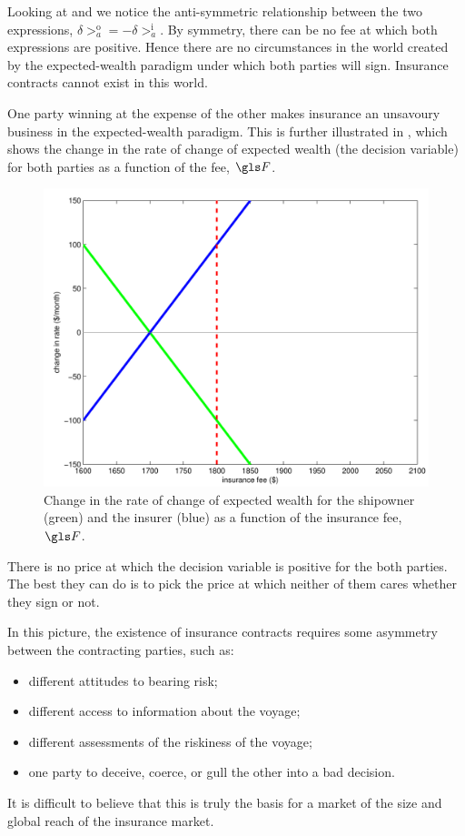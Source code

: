Looking at  and  we notice the anti-symmetric relationship between
the two expressions,  
$\delta\gt_a^\text{o}=-\delta\gt_a^\text{i}$.
By symmetry, there can be no fee at which both expressions are positive. 
Hence there are no circumstances in the world created by the 
expected-wealth paradigm under which both parties will sign. Insurance
contracts cannot exist in this world.

One party winning at the expense of the other makes insurance an 
unsavoury business in the expected-wealth paradigm. This is further 
illustrated in , which shows the change in the rate of 
change of expected wealth (the decision variable) for both parties 
as a function of the fee, $\F$.
\begin{figure}
\centering
\includegraphics[width=\textwidth]{./chapter_decisions/figs/ins_lin_cropped.pdf}
\caption{Change in the rate of change of expected wealth for the shipowner (green) and the 
insurer (blue) as a function of the insurance fee, $\F$.}
\end{figure}
There is no price at which the decision variable is positive for the both parties. The best they can 
do is to pick the price at which neither of them cares whether they sign or not.

In this picture, the existence of insurance contracts requires some asymmetry between the contracting parties, such as:
\begin{itemize}
\item different attitudes to bearing risk;
\item different access to information about the voyage;
\item different assessments of the riskiness of the voyage;
\item one party to deceive, coerce, or gull the other into a bad decision.
\end{itemize}
It is difficult to believe that this is truly the basis for a market of the size and global reach of the insurance market.

